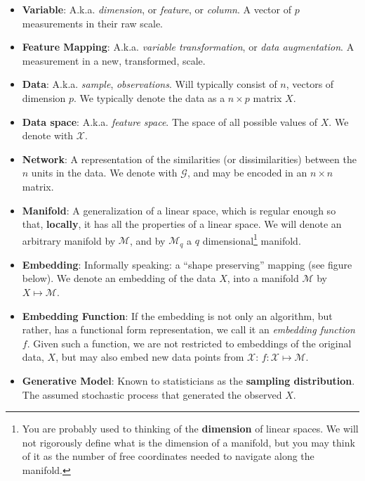 \documentclass[]{book}
\theoremstyle{definition}
\theoremstyle{definition}
\theoremstyle{definition}
\theoremstyle{remark}
\begin{document}
\begin{itemize}
\item
  \textbf{Variable}: A.k.a. \emph{dimension}, or \emph{feature}, or
  \emph{column}. A vector of \(p\) measurements in their raw scale.
\item
  \textbf{Feature Mapping}: A.k.a. \emph{variable transformation}, or
  \emph{data augmentation}. A measurement in a new, transformed, scale.
\item
  \textbf{Data}: A.k.a. \emph{sample}, \emph{observations}. Will
  typically consist of \(n\), vectors of dimension \(p\). We typically
  denote the data as a \(n\times p\) matrix \(X\).
\item
  \textbf{Data space}: A.k.a. \emph{feature space}. The space of all
  possible values of \(X\). We denote with \(\mathcal{X}\).
\item
  \textbf{Network}: A representation of the similarities (or
  dissimilarities) between the \(n\) units in the data. We denote with
  \(\mathcal{G}\), and may be encoded in an \(n \times n\) matrix.
\item
  \textbf{Manifold}: A generalization of a linear space, which is
  regular enough so that, \textbf{locally}, it has all the properties of
  a linear space. We will denote an arbitrary manifold by
  \(\mathcal{M}\), and by \(\mathcal{M}_q\) a \(q\)
  dimensional\footnote{You are probably used to thinking of the
    \textbf{dimension} of linear spaces. We will not rigorously define
    what is the dimension of a manifold, but you may think of it as the
    number of free coordinates needed to navigate along the manifold.}
  manifold.
\item
  \textbf{Embedding}: Informally speaking: a ``shape preserving''
  mapping (see figure below). We denote an embedding of the data \(X\),
  into a manifold \(\mathcal{M}\) by \(X\mapsto \mathcal{M}\).
\item
  \textbf{Embedding Function}: If the embedding is not only an
  algorithm, but rather, has a functional form representation, we call
  it an \emph{embedding function} \(f\). Given such a function, we are
  not restricted to embeddings of the original data, \(X\), but may also
  embed new data points from \(\mathcal{X}\):
  \(f:\mathcal{X}\mapsto\mathcal{M}\).
\item
  \textbf{Generative Model}: Known to statisticians as the
  \textbf{sampling distribution}. The assumed stochastic process that
  generated the observed \(X\).
\end{itemize}
\end{document}
